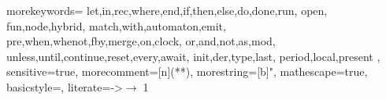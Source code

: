 
   {morekeywords={
	let,in,rec,where,end,if,then,else,do,done,run,
	open,
	fun,node,hybrid,
	match,with,automaton,emit,
	pre,when,whenot,fby,merge,on,clock,
	or,and,not,as,mod,
	unless,until,continue,reset,every,await,
	init,der,type,last,
        period,local,present
    },
    sensitive=true,
    morecomment=[n]{(*}{*)},
    morestring=[b]",
    mathescape=true,
    basicstyle=\sffamily\footnotesize,
    literate={->}{{$\rightarrow\;$}}1
    }

    {\lstset{language=hybrid}}
    {}


\newcommand{\hy}[1]{\ensuremath{\mbox{\lstinline[language=hybrid]{#1}}}}
\newcommand{\hys}[1]{\ensuremath{\mbox{\lstinline[language=hybrid,basicstyle=\sffamily\tiny]{#1}}}}

